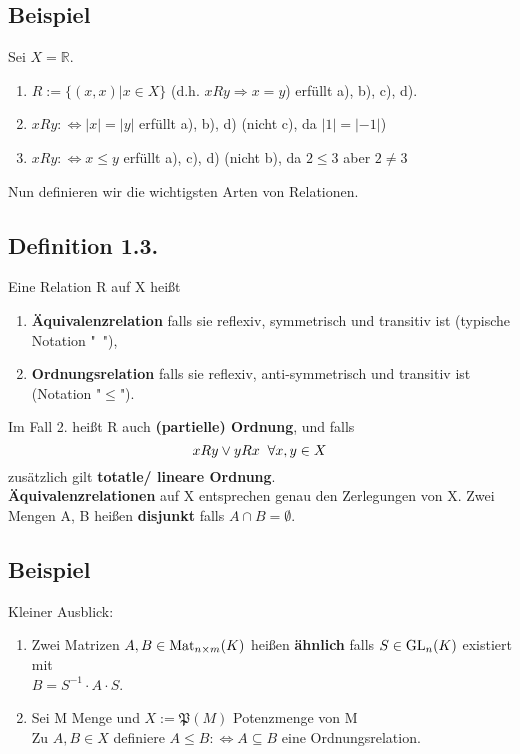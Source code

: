 \documentclass {article}
\newcommand{\tn}[1]{\textnormal {#1}}
\begin{document}
\subsection*{Beispiel} 
Sei $X = \mathbb R$.
\begin{enumerate}[label=(\alph*)]
\item $ R:=\{(x,x) | x\in X\}$ (d.h. $xRy \Rightarrow x=y$) erfüllt a), b), c), d).
\item $ xRy :\iff |x|=|y|$ erfüllt a), b), d) (nicht c), da $|1|=|-1|$)
\item $ xRy :\iff x\leq y$ erfüllt a), c), d) (nicht b), da $2\leq 3$ aber $2 \neq 3$
\end{enumerate}
Nun definieren wir die wichtigsten Arten von Relationen.

\subsection*{Definition 1.3.}
Eine Relation R auf X heißt
\begin{enumerate}[label=(\arabic*)]
\item \textbf{Äquivalenzrelation} falls sie reflexiv, symmetrisch und transitiv ist (typische Notation "~"),
\item \textbf{Ordnungsrelation} falls sie reflexiv, anti-symmetrisch und transitiv ist (Notation "$\leq$").
\end{enumerate}
Im Fall 2. heißt R auch \textbf{(partielle) Ordnung}, und falls 
$$ xRy \lor yRx \hspace*{2mm} \forall x,y \in X$$
zusätzlich gilt \textbf{totatle/ lineare Ordnung}.\\
\textbf{Äquivalenzrelationen} auf X entsprechen genau den Zerlegungen von X.
Zwei Mengen A, B heißen \textbf{disjunkt} falls $A \cap B = \emptyset$.

\subsection*{Beispiel}
Kleiner Ausblick:
\begin{enumerate}[label=(\alph*)]
\item Zwei Matrizen $A,B \in \tn{Mat}_{n{\times}m}(K)$ heißen \textbf{ähnlich} falls $S \in \tn{GL}_n(K)$ existiert mit \\$B=S^{-1}{\cdot}A{\cdot}S$.
\item Sei M Menge und $X:=\mathfrak P(M)$ Potenzmenge von M\\
 Zu $A,B \in X$ definiere $A\leq B :\iff A\subseteq B$ eine Ordnungsrelation.
\end{enumerate}
\end{document}
